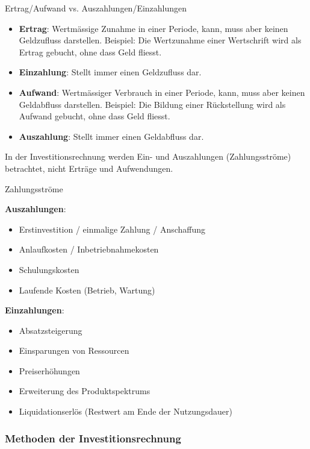 \begin{concept}{Ertrag/Aufwand vs. Auszahlungen/Einzahlungen}
\begin{itemize}
    \item \textbf{Ertrag}: Wertmässige Zunahme in einer Periode, kann, muss aber keinen Geldzufluss darstellen. Beispiel: Die Wertzunahme einer Wertschrift wird als Ertrag gebucht, ohne dass Geld fliesst.
    \item \textbf{Einzahlung}: Stellt immer einen Geldzufluss dar.
    \item \textbf{Aufwand}: Wertmässiger Verbrauch in einer Periode, kann, muss aber keinen Geldabfluss darstellen. Beispiel: Die Bildung einer Rückstellung wird als Aufwand gebucht, ohne dass Geld fliesst.
    \item \textbf{Auszahlung}: Stellt immer einen Geldabfluss dar.
\end{itemize}

In der Investitionsrechnung werden Ein- und Auszahlungen (Zahlungsströme) betrachtet, nicht Erträge und Aufwendungen.
\end{concept}

\begin{definition}{Zahlungsströme}

    \textbf{Auszahlungen}:
    \begin{itemize}
        \item Erstinvestition / einmalige Zahlung / Anschaffung
        \item Anlaufkosten / Inbetriebnahmekosten
        \item Schulungskosten
        \item Laufende Kosten (Betrieb, Wartung)
    \end{itemize}
\textbf{Einzahlungen}:
    \begin{itemize}
        \item Absatzsteigerung
        \item Einsparungen von Ressourcen
        \item Preiserhöhungen
        \item Erweiterung des Produktspektrums
        \item Liquidationserlös (Restwert am Ende der Nutzungsdauer)
    \end{itemize}
\end{definition}

\subsubsection{Methoden der Investitionsrechnung}

